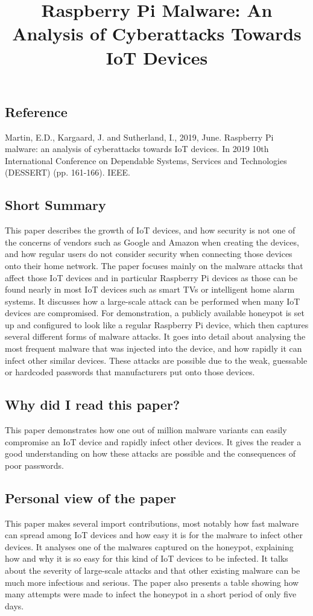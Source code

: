 \documentclass[11pt,a4paper]{article}
\title{Raspberry Pi Malware: An Analysis of Cyberattacks Towards IoT Devices}
\author{}
\date{}
\begin{document}
\maketitle

\subsection*{Reference}
Martin, E.D., Kargaard, J. and Sutherland, I., 2019, June. Raspberry Pi malware: an analysis of cyberattacks towards IoT devices. In 2019 10th International Conference on Dependable Systems, Services and Technologies (DESSERT) (pp. 161-166). IEEE.

\subsection*{Short Summary} 
This paper describes the growth of IoT devices, and how security is not one of the concerns of vendors such as Google and Amazon when creating the devices, and how regular users do not consider security when connecting those devices onto their home network. The paper focuses mainly on the malware attacks that affect those IoT devices and in particular Raspberry Pi devices as those can be found nearly in most IoT devices such as smart TVs or intelligent home alarm systems. It discusses how a large-scale attack can be performed when many IoT devices are compromised. For demonstration, a publicly available honeypot is set up and configured to look like a regular Raspberry Pi device, which then captures several different forms of malware attacks. It goes into detail about analysing the most frequent malware that was injected into the device, and how rapidly it can infect other similar devices. These attacks are possible due to the weak, guessable or hardcoded passwords that manufacturers put onto those devices. 

\subsection*{Why did I read this paper?}
This paper demonstrates how one out of million malware variants can easily compromise an IoT device and rapidly infect other devices. It gives the reader a good understanding on how these attacks are possible and the consequences of poor passwords. 

\subsection*{Personal view of the paper}
This paper makes several import contributions, most notably how fast malware can spread among IoT devices and how easy it is for the malware to infect other devices. It analyses one of the malwares captured on the honeypot, explaining how and why it is so easy for this kind of IoT devices to be infected. It talks about the severity of large-scale attacks and that other existing malware can be much more infectious and serious. The paper also presents a table showing how many attempts were made to infect the honeypot in a short period of only five days. 
\end{document}
